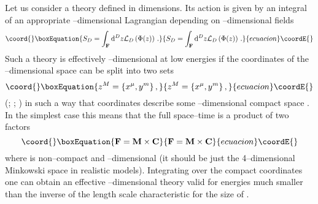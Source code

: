 \documentclass[a4paper,12pt]{article}
\def\d{{\rm d}}
\def\cL{{\cal L}}
\def\bC{{\bf C}}
\def\bF{{\bf F}}
\def\bM{{\bf M}}
\begin{document}
Let us consider a theory defined in \coordHE{} dimensions. Its action is
given by an integral of an appropriate \coordHE{}--dimensional Lagrangian
depending on \coordHE{}--dimensional fields 
\begin{equation}\coord{}\boxEquation{
S_D=\int_\bF\d^Dz\cL_D\left(\Phi(z)\right)
\,.
}{
S_D=\int_\bF\d^Dz\cL_D\left(\Phi(z)\right)
\,.
}{ecuacion}\coordE{}\end{equation}
Such a theory is effectively \coordHE{}--dimensional at low energies if
the coordinates \coordHE{} of the \coordHE{}--dimensional space \myHighlight{$\bF$}\coordHE{} can be
split into two sets
\begin{equation}\coord{}\boxEquation{
z^M=\{x^\mu,y^m\}
\,,
}{
z^M=\{x^\mu,y^m\}
\,,
}{ecuacion}\coordE{}\end{equation}
(\coordHE{}; \coordHE{}; \coordHE{}) in such a way
that coordinates \coordHE{} describe some \coordHE{}--dimensional compact
space \myHighlight{$\bC$}\coordHE{}. In the simplest case this means that the full space--time
is a product of two factors
\begin{equation}\coord{}\boxEquation{
\bF=\bM\times\bC
}{
\bF=\bM\times\bC
}{ecuacion}\coordE{}\end{equation}
where \myHighlight{$\bM$}\coordHE{} is non--compact and \coordHE{}--dimensional (it should be
just the 4--dimensional Minkowski space in realistic models). 
Integrating over the compact coordinates \coordHE{} one can obtain an
effective \coordHE{}--dimensional theory valid for
energies much smaller than the inverse of the length scale
characteristic for the size of \myHighlight{$\bC$}\coordHE{}. 
\end{document}
